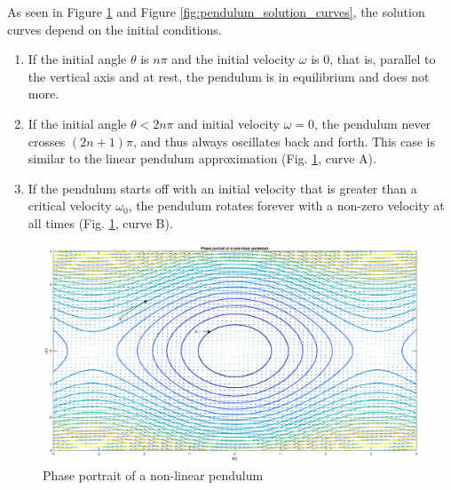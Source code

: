 \documentclass[12pt,1in]{article}
\begin{document}
As seen in Figure \ref{fig:pendulum_phase} and Figure \ref{fig:pendulum_solution_curves}, the solution curves depend on the initial conditions. 
\begin{enumerate}
	\item If the initial angle $\theta$ is $n\pi$ and the initial velocity $\omega$ is $0$, that is, parallel to the vertical axis and at rest, the pendulum is in equilibrium and does not more. 
	\item If the initial angle $\theta < 2n\pi$ and initial velocity $\omega = 0$, the pendulum never crosses $(2n + 1)\pi$, and thus always oscillates back and forth. This case is similar to the linear pendulum approximation (Fig. \ref{fig:pendulum_phase}, curve A). 
	\item If the pendulum starts off with an initial velocity that is greater than a critical velocity $\omega_0$, the pendulum rotates forever with a non-zero velocity at all times (Fig. \ref{fig:pendulum_phase}, curve B).
\end{enumerate}

\begin{figure}[H]
	\centering
	\includegraphics[trim={2in 0 1.5in 0}, width=\linewidth]{Figures/pendulum_phase}
	\caption{Phase portrait of a non-linear pendulum}
	\label{fig:pendulum_phase}
\end{figure}
\end{document}
